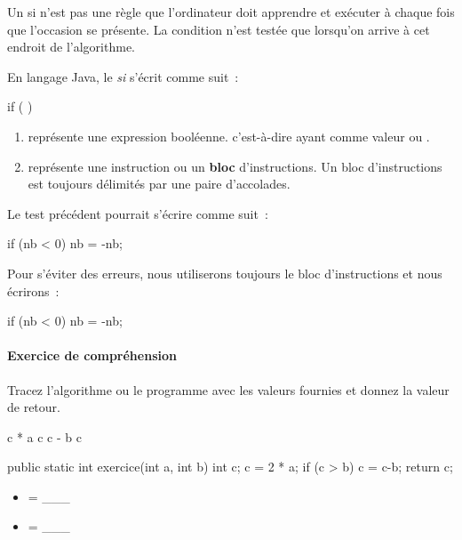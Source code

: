 	Un \og{}si\fg{} n’est pas une règle que l’ordinateur doit apprendre et
	exécuter à chaque fois que l’occasion se présente.  La condition n’est
	testée que lorsqu’on arrive à cet endroit de l’algorithme.
	
	En langage Java, le \emph{si} s'écrit comme suit~:

	\begin{grammaire}
		if (  ) 
	\end{grammaire}

	\begin{enumerate}
		\item {} représente une expression booléenne. 
			c'est-à-dire ayant comme valeur  ou .
		\item {} représente une instruction ou un 
			\textbf{bloc} d'instructions. Un bloc  d'instructions 
			est toujours délimités par une paire d'accolades. 
	\end{enumerate}

	\clearpage
	Le test précédent pourrait s'écrire comme suit~:

	\begin{java}
if (nb < 0)
	nb = -nb;
	\end{java}

	Pour s'éviter des erreurs, nous utiliserons toujours le bloc d'instructions
	et nous écrirons~:

	\begin{java}
if (nb < 0){
	nb = -nb;
}
	\end{java}

	\begin{Emphase}
		\paragraph{Exercice de compréhension}
		Tracez  l'algorithme ou le programme avec les valeurs fournies et donnez
		la valeur de retour.
		
		\begin{pseudocode}
			\Let c  * a
				\Let c \Gets c - b
			\EndIf
			\Return c
		\EndAlgo
		\end{pseudocode}		
		
		\begin{java}
public static int exercice(int a, int b){
	int c;
	c = 2 * a;
	if (c > b){
		c = c-b;
	}
	return c;
}
		\end{java}
		
		\begin{multicols}{2}
		\begin{itemize}
		\item {} = \_\_\_
		\item {} = \_\_\_
		\end{itemize}
		\end{multicols}	
	\end{Emphase}


